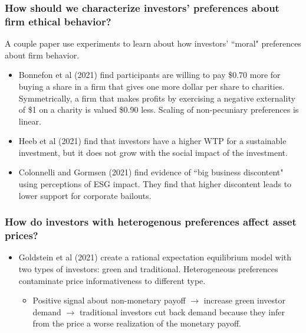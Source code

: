 \documentclass{beamer}
\begin{document}
\begin{frame}
\frametitle{How should we characterize investors' preferences about firm ethical behavior?}
A couple paper use experiments to learn about how investors' ``moral" preferences about firm behavior.
\bigskip
\begin{itemize}[<+->]
\item Bonnefon et al (2021) find participants are willing to pay \$0.70 more for buying a share in a firm that gives one more dollar per share to charities. Symmetrically, a firm that makes profits by exercising a negative externality of \$1 on a charity is valued \$0.90 less. Scaling of non-pecuniary preferences is linear.
\bigskip
\item Heeb et al (2021) find that investors have a higher WTP for a sustainable investment, but it does not grow with the social impact of the investment.
\bigskip
\item Colonnelli and Gormsen (2021) find evidence of ``big business discontent" using perceptions of ESG impact.  They find that higher discontent leads to lower support for corporate bailouts.
\end{itemize}
\end{frame}


\begin{frame}
\frametitle{How do investors with heterogenous preferences affect asset prices?}
\bigskip
\begin{itemize}[<+->]
\item Goldstein et al (2021) create a rational expectation equilibrium model with two types of investors: green and traditional. Heterogeneous preferences contaminate price informativeness to different type.  
\begin{itemize}
\item Positive signal about non-monetary payoff $\rightarrow$ increase green investor demand $\rightarrow$ traditional investors cut back demand because they infer from  the price a worse realization of the monetary payoff.
\end{itemize}
\end{itemize}
\end{frame}
\end{document}
